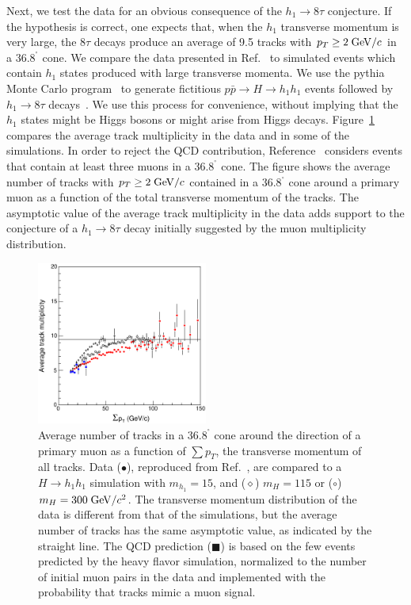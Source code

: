 \documentclass[twocolumn,10pt,prl,preprint,floatfix,nofootinbib,superscriptaddress,showpacs,amssymb]{revtex4}
\def\deg{^\circ}
\begin{document}
 Next, we test the data for an obvious consequence of the
 $h_1 \rightarrow 8 \tau$ conjecture. If the hypothesis is correct, one 
 expects that, when  the $h_1$ transverse momentum is very large, the $8\tau$
 decays produce an average of 9.5 tracks with $p_T \geq 2 \; {\rm GeV/}c$ in a 
 $36.8^{\deg}$ cone. We compare the data presented in Ref.~\cite{a0disc}
 to simulated events which contain $h_1$ states produced with large 
 transverse momenta. We use the {\sc pythia} Monte Carlo program~\cite{pythia} 
 to generate fictitious $ p \bar{p} \rightarrow H \rightarrow h_1 h_1$ events
 followed by $h_1 \rightarrow 8 \tau$ decays~\cite{sim}. We use this process
 for convenience, without implying that the $h_1$ states might be Higgs
 bosons or might arise from Higgs decays. Figure~\ref{fig:fig_17} compares
 the average track multiplicity in the data and in some of the simulations.
 In order to reject the QCD contribution, Reference~\cite{a0disc} considers 
 events that contain at least three muons in a $36.8^{\deg}$ cone. The figure
 shows the average number of tracks with $p_T\geq 2 \; {\rm GeV/}c$ contained in
 a 36.8$^{\deg}$ cone around a primary muon as a function of the total
 transverse momentum of the tracks. The asymptotic value of the average
 track multiplicity in the data adds support to the conjecture of a
 $h_1 \rightarrow 8 \tau$ decay initially suggested by the muon multiplicity
 distribution. 
 \begin{figure}
 \begin{center}
 \vspace{-0.3in}
 \leavevmode
 \includegraphics*[width=0.5\textwidth]{fa0_17new.eps}
 \caption[]{Average number of tracks in a $36.8^{\deg}$ cone around the
            direction of a primary muon as a function of $\sum p_T$, the
            transverse momentum of all tracks. Data ($\bullet$), reproduced
            from Ref.~\cite{a0disc}, are compared to a 
            $H \rightarrow h_1 h_1$ simulation with
            $m_{h_1}=15$, and ($\diamond$) $m_H=115$ or ($\circ$) 
            $m_H=300 \; {\rm GeV/}c^2$. The transverse momentum distribution of
            the data is different from that of the simulations, but the average
            number of tracks has the same asymptotic value, as indicated by
            the straight line. The QCD prediction ({\tiny $\blacksquare$}) is
            based on the few events predicted by the heavy flavor simulation,
            normalized to the number of initial muon pairs in the data and
            implemented with the probability that tracks mimic a muon signal.}
 \label{fig:fig_17}
 \end{center}
 \end{figure}
\end{document}
